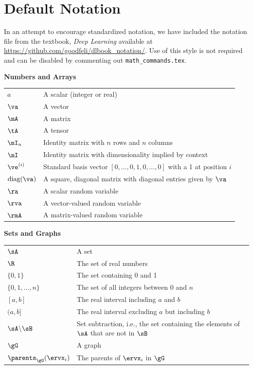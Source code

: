 \documentclass[10pt]{article} %
\begin{document}
\section{Default Notation}

In an attempt to encourage standardized notation, we have included the
notation file from the textbook, \textit{Deep Learning}
\cite{goodfellow2016deep} available at
\url{https://github.com/goodfeli/dlbook_notation/}.  Use of this style
is not required and can be disabled by commenting out
\texttt{math\_commands.tex}.


\centerline{\bf Numbers and Arrays}
\bgroup
\def\arraystretch{1.5}
\begin{tabular}{p{1in}p{3.25in}}
$\displaystyle a$ & A scalar (integer or real)\\
$\displaystyle \va$ & A vector\\
$\displaystyle \mA$ & A matrix\\
$\displaystyle \tA$ & A tensor\\
$\displaystyle \mI_n$ & Identity matrix with $n$ rows and $n$ columns\\
$\displaystyle \mI$ & Identity matrix with dimensionality implied by context\\
$\displaystyle \ve^{(i)}$ & Standard basis vector $[0,\dots,0,1,0,\dots,0]$ with a 1 at position $i$\\
$\displaystyle \text{diag}(\va)$ & A square, diagonal matrix with diagonal entries given by $\va$\\
$\displaystyle \ra$ & A scalar random variable\\
$\displaystyle \rva$ & A vector-valued random variable\\
$\displaystyle \rmA$ & A matrix-valued random variable\\
\end{tabular}
\egroup
\vspace{0.25cm}

\centerline{\bf Sets and Graphs}
\bgroup
\def\arraystretch{1.5}

\begin{tabular}{p{1.25in}p{3.25in}}
$\displaystyle \sA$ & A set\\
$\displaystyle \R$ & The set of real numbers \\
$\displaystyle \{0, 1\}$ & The set containing 0 and 1 \\
$\displaystyle \{0, 1, \dots, n \}$ & The set of all integers between $0$ and $n$\\
$\displaystyle [a, b]$ & The real interval including $a$ and $b$\\
$\displaystyle (a, b]$ & The real interval excluding $a$ but including $b$\\
$\displaystyle \sA \backslash \sB$ & Set subtraction, i.e., the set containing the elements of $\sA$ that are not in $\sB$\\
$\displaystyle \gG$ & A graph\\
$\displaystyle \parents_\gG(\ervx_i)$ & The parents of $\ervx_i$ in $\gG$
\end{tabular}
\vspace{0.25cm}
\end{document}

